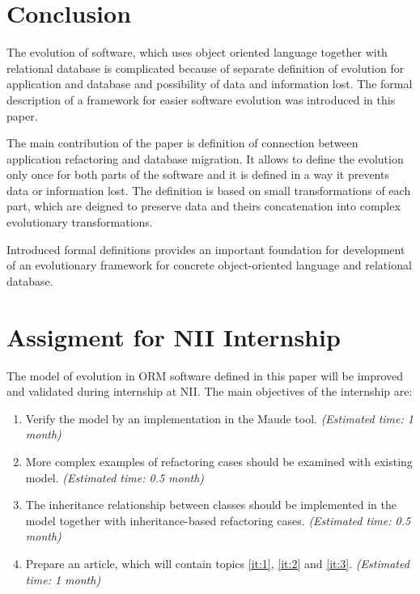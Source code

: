 \documentclass[11pt]{article}
\begin{document}
 
\section{Conclusion}
The evolution of software, which uses object oriented language together with relational database is complicated because of separate definition of evolution for application and database and possibility of data and information lost. The formal description of a framework for easier software evolution was introduced in this paper. 

The main contribution of the paper is definition of connection between application refactoring and database migration. It allows to define the evolution only once for both parts of the software and it is defined in a way it prevents data or information lost. The definition is based on small transformations of each part, which are deigned to preserve data and theirs concatenation into complex evolutionary transformations.

Introduced formal definitions provides an important foundation for development of an evolutionary framework for concrete object-oriented language and relational database.

\newpage
\appendix
\section{Assigment for NII Internship}
The model of evolution in ORM software defined in this paper will be improved and validated during internship at NII. The main objectives of the internship are:
\begin{enumerate}
	\item \label{it:1} Verify the model by an implementation in the Maude tool. \emph{(Estimated time: 1 month)}
	\item \label{it:2} More complex examples of refactoring cases should be examined with existing model.  \emph{(Estimated time: 0.5 month)}
	\item \label{it:3} The inheritance relationship between classes should be implemented in the model together with inheritance-based refactoring cases. \emph{(Estimated time: 0.5 month)}
	\item Prepare an article, which will contain topics \ref{it:1}, \ref{it:2} and \ref{it:3}. \emph{(Estimated time: 1 month)}
\end{enumerate}
\end{document}
